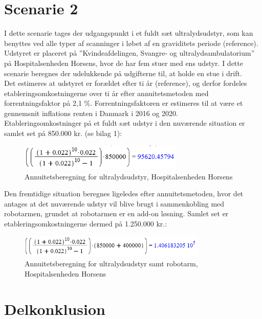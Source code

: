 \section{Scenarie 2}
I dette scenarie tages der udgangspunkt i et fuldt sæt ultralydsudstyr, som kan benyttes ved alle typer af scanninger i løbet af en graviditets periode (reference). Udstyret er placeret på ”Kvindeafdelingen, Svangre- og ultralydsambulatorium” på Hospitalsenheden Horsens, hvor de har fem stuer med ens udstyr. I dette scenarie beregnes der udelukkende på udgifterne til, at holde en stue i drift. \\
Det estimeres at udstyret er forældet efter ti år (reference), og derfor fordeles etableringsomkostningerne over ti år efter annuitetsmetoden med forrentningsfaktor på 2,1 \%. Forrentningsfaktoren er estimeres til at være et gennemsnit inflations renten i Danmark i 2016 og 2020.  \\
Etableringsomkostninger på et fuldt sæt udstyr i den nuværende situation er samlet set på 850.000 kr. (se bilag 1):
\begin{figure}[h!]\centering
	\includegraphics[width = 0.7\textwidth]{Figurer/HorsensOkonomi}
	\caption{Annuitetsberegning for ultralydsudstyr, Hospitalsenheden Horsens}
	\label{HorsensOkonomi}
\end{figure}

Den fremtidige situation beregnes ligeledes efter annuitetsmetoden, hvor det antages at det nuværende udstyr vil blive brugt i sammenkobling med robotarmen, grundet at robotarmen er en add-on løsning. Samlet set er etableringsomkostningerne dermed på 1.250.000 kr.:
\begin{figure}[h!]\centering
	\includegraphics[width = 0.8\textwidth]{Figurer/HorsensRobotOkonomi}
	\caption{Annuitetsberegning for ultralydsudstyr samt robotarm, Hospitalsenheden Horsens}
	\label{HorsensRobotOkonomi}
\end{figure}

\section{Delkonklusion}

